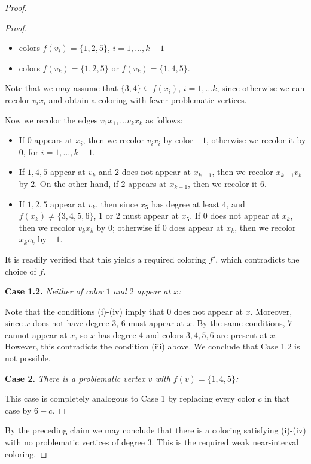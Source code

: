 \documentclass[10pt,a4paper]{amsart}
\begin{document}
\begin{proof}
\begin{proof}
\begin{itemize}
	\item colors $f(v_i)=\{1,2,5\}$, $i=1,\dots, k-1$

	\item colors $f(v_k)=\{1,2,5\}$ or $f(v_k)=\{1,4,5\}$.

\end{itemize}	
	Note that we may assume that $\{3,4\} \subseteq f(x_i)$,  $i=1,\dots k$, 
	since otherwise we can recolor $v_i x_i$
	and obtain a coloring with fewer problematic vertices.

	Now we recolor the edges $v_1x_1, \dots v_k x_k$ as follows:

\begin{itemize}

	\item If $0$ appears at $x_i$, then we recolor $v_i x_i$ by color $-1$, otherwise 
	we recolor it by $0$, for $i=1,\dots, k-1$.
	
	\item If $1,4,5$ appear at $v_k$ and $2$ does not appear at $x_{k-1}$, then we recolor $x_{k-1}v_k$
 	by $2$. On the other
	hand, if $2$ appears at $x_{k-1}$, then we recolor it $6$.


	\item If $1,2,5$ appear at $v_k$, then since $x_5$ has degree at least $4$, and 
	$f(x_k) \neq \{3,4,5,6\}$, $1$ or $2$ must appear at $x_5$.
	If $0$ does not appear at $x_k$, then we recolor $v_kx_k$ by $0$;
	otherwise if $0$ does appear at $x_k$, then we recolor $x_k v_k$ by $-1$.
\end{itemize}

	It is readily verified that this yields a required coloring $f'$, which contradicts the choice of $f$.

	\bigskip

	{\bf Case 1.2.} {\em Neither of color $1$ and $2$ appear at $x$:}

	Note that the conditions (i)-(iv) imply that $0$ does not appear at $x$. 
	Moreover, since $x$ does not have degree $3$, $6$ must appear at $x$.
	By the same conditions, $7$ cannot appear at $x$, so
	$x$ has degree $4$ and colors $3,4,5,6$ are present at $x$.
	However, this contradicts the condition (iii) above.
	We conclude that Case 1.2 is not possible.


	\bigskip

	{\bf Case 2.}	 {\em There is a problematic vertex $v$ with $f(v) = \{1,4,5\}$:}

	This case is completely analogous to Case 1 by replacing every color $c$ in that case by $6-c$.
\end{proof}	
\bigskip

	By the preceding claim we may conclude that there is a coloring satisfying (i)-(iv) with no problematic
	vertices of degree $3$. This is the required weak near-interval coloring.
\end{proof}
\end{document}
